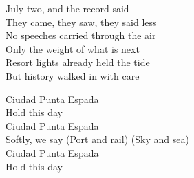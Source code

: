 \begin{lyrics}
July two, and the record said\\
They came, they saw, they said less\\
No speeches carried through the air\\
Only the weight of what is next\\
Resort lights already held the tide\\
But history walked in with care

Ciudad Punta Espada\\
Hold this day\\
Ciudad Punta Espada\\
Softly, we say
(Port and rail)
(Sky and sea)\\
Ciudad Punta Espada\\
Hold this day
\end{lyrics}

